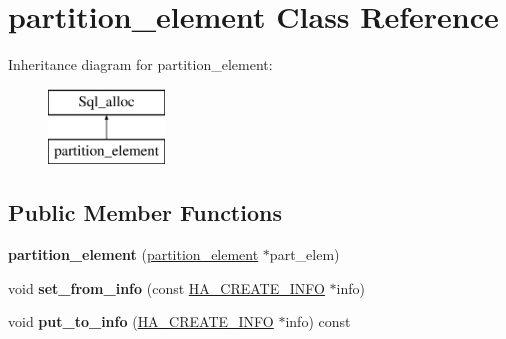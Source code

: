 \hypertarget{classpartition__element}{}\section{partition\+\_\+element Class Reference}
\label{classpartition__element}
Inheritance diagram for partition\+\_\+element\+:\begin{figure}[H]
\begin{center}
\leavevmode
\includegraphics[height=2.000000cm]{classpartition__element}
\end{center}
\end{figure}
\subsection*{Public Member Functions}
\begin{DoxyCompactItemize}
\item 
\mbox{\label{classpartition__element_ae3d08814c6b83d1cc29cf841854b1e99}} 
{\bfseries partition\+\_\+element} (\mbox{\hyperlink{classpartition__element}{partition\+\_\+element}} $\ast$part\+\_\+elem)
\item 
\mbox{\label{classpartition__element_a0c536a876a4d3e0bbeb36c6f4f6a296c}} 
void {\bfseries set\+\_\+from\+\_\+info} (const \mbox{\hyperlink{structst__ha__create__information}{H\+A\+\_\+\+C\+R\+E\+A\+T\+E\+\_\+\+I\+N\+FO}} $\ast$info)
\item 
\mbox{\label{classpartition__element_ab18333fb1dc3b890a7d5847646eb7241}} 
void {\bfseries put\+\_\+to\+\_\+info} (\mbox{\hyperlink{structst__ha__create__information}{H\+A\+\_\+\+C\+R\+E\+A\+T\+E\+\_\+\+I\+N\+FO}} $\ast$info) const
\end{DoxyCompactItemize}
